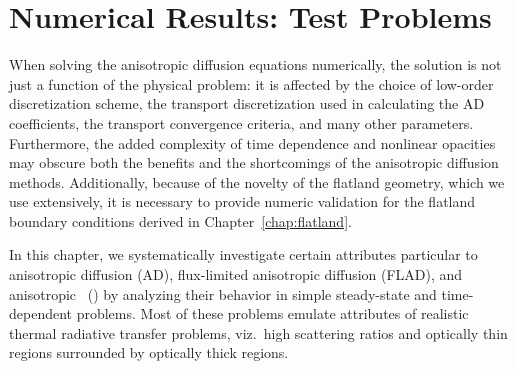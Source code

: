 
\chapter{Numerical Results: Test Problems}\label{chap:simpleNumericalResults}

When solving the anisotropic diffusion equations numerically, the solution
is not just a function of the physical problem: it is affected by the choice
of low-order discretization scheme, the transport discretization used in
calculating the AD coefficients, the transport convergence criteria, and many
other parameters. Furthermore, the added complexity of time dependence and
nonlinear opacities may obscure both the benefits and the shortcomings of the
anisotropic diffusion methods. Additionally, because of the novelty of the
flatland geometry, which we use extensively, it is necessary to provide numeric
validation for the flatland boundary conditions derived in
Chapter~\ref{chap:flatland}.

In this chapter, we systematically investigate certain attributes particular to
anisotropic diffusion (AD), flux-limited anisotropic diffusion (FLAD), and
anisotropic \Pone\ (\APone) by analyzing their behavior in simple steady-state
and time-dependent problems. Most of these problems emulate attributes of
realistic thermal radiative transfer problems, viz.~high scattering ratios and
optically thin regions surrounded by optically thick regions.

